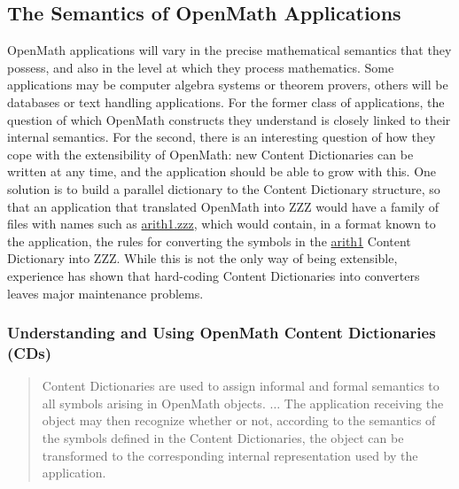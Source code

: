 \documentclass[keylogo]{openmath}
\begin{document}
\subsection{The Semantics of OpenMath Applications}
OpenMath applications will vary in the precise mathematical semantics
that they possess, and also in the level at which they process
mathematics. Some applications may be computer algebra systems or
theorem provers, others will be databases or text handling
applications. For the former class of applications, the question of
which OpenMath constructs they understand is closely linked to their
internal semantics. For the second, there is an interesting question
of how they cope with the extensibility of OpenMath: new Content
Dictionaries can be written at any time, and the application should be
able to grow with this. One solution is to build a parallel dictionary
to the Content Dictionary structure, so that an application that
translated OpenMath into ZZZ would have a family of files with names
such as \url{arith1.zzz}, which would contain, in a format known to
the application, the rules for converting the symbols in the
\url{arith1} Content Dictionary into ZZZ. While this is not the only
way of being extensible, experience has shown that hard-coding Content
Dictionaries into converters leaves major maintenance problems.
\subsubsection{Understanding and Using OpenMath Content Dictionaries (CDs)}

\begin{quotation}
  Content Dictionaries are used to assign informal and formal semantics
  to all symbols arising in OpenMath objects. $\ldots$ The application
  receiving the object may then recognize whether or not, according to
  the semantics of the symbols defined in the Content Dictionaries,
  the object can be transformed to the corresponding internal
  representation used by the application.  \cite{OMstd}
\end{quotation}
\end{document}
